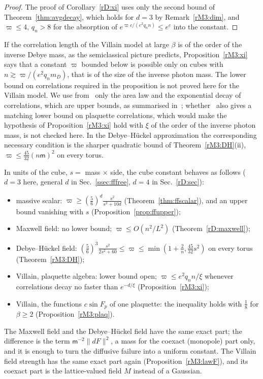 \begin{proof}
The proof of Corollary~\ref{rD:xi} uses only the second bound of
Theorem~\ref{thm:avgdecay}, which holds for $d=3$ by
Remark~\ref{rM3:dim}, and $\varpi\le4$, $q_n>8$ for the absorption of
$e^{\varpi c/(e^2q_nn)}\le e^c$ into the constant.
\end{proof}

If the correlation length of the Villain model at large $\beta$ is of
the order of the inverse Debye mass, as the semiclassical picture
predicts, Proposition~\ref{rM3:xi} says that a constant $\varpi$ bounded
below is possible only on cubes with $n\gtrsim\varpi/(e^2q_nm_D)$, that is
of the size of the inverse photon mass. The lower bound on correlations
required in the proposition is not proved here for the Villain model. We
use from~\cite{GM82} only the area law and the exponential decay of
correlations, which are upper bounds, as summarised in~\cite{Cha18,RFN24};
whether~\cite{GM82} also gives a matching lower bound on plaquette
correlations, which would make the hypothesis of
Proposition~\ref{rM3:xi} hold with $\xi$ of the order of the inverse
photon mass, is not checked here. In the Debye--H\"uckel approximation the
corresponding necessary condition is the sharper quadratic bound of
Theorem~\ref{rM3:DH}(ii), $\varpi\le\frac{45}{32}(n\mathsf m)^2$ on every
torus.

\begin{remark}
\label{rM3:table}
In units of the cube, $s=$ mass $\times$ side, the cube constant behaves
as follows ($d=3$ here, general $d$ in Sec.~\ref{ssec:fffree}, $d=4$ in
Sec.~\ref{rD:sec}):
\begin{itemize}[leftmargin=*]
\item massive scalar: $\varpi\ge(\frac56)^d\frac{s^2}{s^2+10d}$
(Theorem~\ref{thm:ffscalar}), and an upper bound vanishing with $s$
(Proposition~\ref{prop:ffupper});
\item Maxwell field: no lower bound; $\varpi\le O(n^2/L^2)$
(Theorem~\ref{rD:maxwell});
\item Debye--H\"uckel field: $(\frac56)^3\frac{s^2}{2s^2+60}\le\varpi\le
\min(1+\frac2n,\frac{45}{32}s^2)$ on every torus (Theorem~\ref{rM3:DH});
\item Villain, plaquette algebra: lower bound open; $\varpi\le e^2q_nn/\xi$
whenever correlations decay no faster than $e^{-d/\xi}$
(Proposition~\ref{rM3:xi});
\item Villain, the functions $c\sin F_p$ of one plaquette: the inequality
holds with $\frac18$ for $\beta\ge2$ (Proposition~\ref{rM3:plaq}).
\end{itemize}
The Maxwell field and the Debye--H\"uckel field have the same exact part;
the difference is the term $\mathsf m^{-2}\lVert dF\rVert^2$, a mass for the
coexact (monopole) part only, and it is enough to turn the diffusive
failure into a uniform constant. The Villain field strength has the same
exact part again (Proposition~\ref{rM3:lawF}), and its coexact part is the
lattice-valued field $M$ instead of a Gaussian.
\end{remark}

